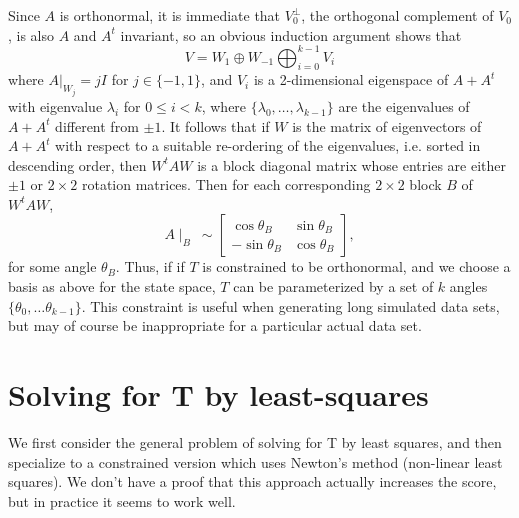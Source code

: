 \documentclass[12pt,leqno]{article}
\begin{document}
Since $A$ is orthonormal, it is immediate that $V_0^{\perp}$,
the orthogonal complement of $V_0$, is also $A$ and $A^t$ invariant, so an obvious induction argument shows that
$$
V = W_1\oplus W_{-1} \bigoplus_{i=0}^{k-1} V_i
$$
where $A|_{W_j} = jI$ for $j \in \{-1,1\}$, and $V_i$ is a 2-dimensional eigenspace of $A+A^t$ with eigenvalue $\lambda_i$
for $0\le i < k$, where $\{\lambda_0,\dots,\lambda_{k-1}\}$ are the eigenvalues of $A+A^t$ different
from $\pm 1$.  It follows that if $W$ is the matrix of eigenvectors of $A+A^t$ with respect to a suitable
re-ordering of the eigenvalues, i.e. sorted in descending order, then $W^tAW$ is a block diagonal matrix
whose entries are either $\pm 1$ or $2\times 2$ rotation matrices.  Then for each corresponding $2\times 2$
block $B$ of $W^tAW$,
$$
A\mid_B ~\sim \left[\begin{matrix}
    \cos\theta_B & \sin\theta_B \\
    -\sin\theta_B & \cos\theta_B
  \end{matrix}\right],
$$
for some angle $\theta_B$.  Thus, if if $T$ is constrained to be orthonormal, and we choose a basis as above
for the state space, $T$ can be  parameterized by a set of $k$ angles $\{\theta_0,\dots\theta_{k-1}\}$.  This
constraint is useful when generating long simulated data sets,  but may of course be inappropriate for a particular
actual data set.








    \section{Solving for T by least-squares}\label{least_squares}
We first consider the general problem of solving for T by least squares, and then specialize to a constrained
version which uses Newton's method (non-linear least squares).  We don't have a proof that this approach actually
increases the score, but in practice it seems to work well.
\end{document}
